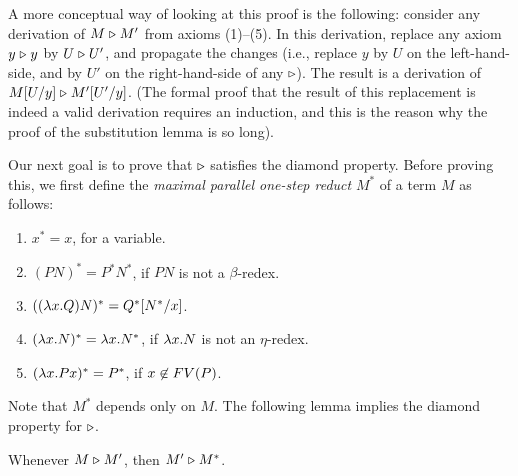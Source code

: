 \documentclass{article}
\begin{document}
A more conceptual way of looking at this proof is the following:
consider any derivation of $M\mathrel{\triangleright} M'$ from axioms (1)--(5). In this
derivation, replace any axiom $y\mathrel{\triangleright} y$ by $U\mathrel{\triangleright} U'$, and propagate
the changes (i.e., replace $y$ by $U$ on the left-hand-side, and by
$U'$ on the right-hand-side of any $\mathrel{\triangleright}$). The result is a derivation
of $M[U/y]\mathrel{\triangleright}M'[U'/y]$. (The formal proof that the
result of this replacement is indeed a valid derivation requires an
induction, and this is the reason why the proof of the substitution
lemma is so long).

Our next goal is to prove that $\mathrel{\triangleright}$ satisfies the diamond
property. Before proving this, we first define the {\em maximal
  parallel one-step reduct} $M^*$ of a term $M$ as follows:

\begin{enumerate}
\item $x^* = x$, for a variable.
\item $(PN)^* = P^*N^*$, if $PN$ is not a $\beta$-redex. 
\item $((\lambda x.Q)N)^* = Q^*[N^*/x]$.
\item $(\lambda x.N)^* = \lambda x.N^*$, if $\lambda x.N$ is not an 
        $\eta$-redex.
\item $(\lambda x.Px)^* = P^*$, if $x\not\in FV(P)$.
\end{enumerate}

Note that $M^*$ depends only on $M$.  The following lemma implies the
diamond property for $\mathrel{\triangleright}$.

\begin{lemma}
\label{lem-max-par}
  Whenever $M \mathrel{\triangleright} M'$, then $M' \mathrel{\triangleright} M^*$.
\end{lemma}
\end{document}
